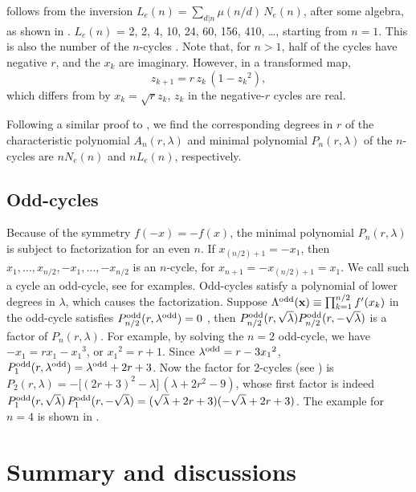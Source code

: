 \documentclass[preprint]{revtex4-1}
\begin{document}
 follows from the inversion
  $L_e(n) = \sum_{d|n} \mu(n/d) \, N_e(n)$,
after some algebra, as shown in .
%
$L_e(n)$ = 2, 2, 4, 10, 24, 60, 156, 410, \ldots, starting from $n = 1$.
%
This is also the number of the $n$-cycles \cite{hao}.
Note that, for $n>1$, half of the cycles have negative $r$,
and the $x_k$ are imaginary.
However, in a transformed map,
\[
z_{k+1} = r \, z_k \, (1 - {z_k}^2),
\]
which differs from  by $x_k = \sqrt{r} z_k$,
$z_k$ in the negative-$r$ cycles are real.



Following a similar proof to ,
we find the corresponding degrees in $r$
of the characteristic polynomial $A_n(r, \lambda)$
  and minimal polynomial $P_n(r, \lambda)$ of the $n$-cycles
are $n N_e(n)$ and $n L_e(n)$, respectively.


\subsection{\label{sec:oddcycle}Odd-cycles}

Because of the symmetry $f(-x) = -f(x)$,
the minimal polynomial $P_n(r, \lambda)$
is subject to factorization for an even $n$.
%
If $x_{(n/2)+1} = -x_1$,
  then $x_1, \ldots, x_{n/2}, -x_1, \ldots, -x_{n/2}$
  is an $n$-cycle,
  for $x_{n+1} = - x_{(n/2)+1} = x_1$.
We call such a cycle an odd-cycle,
see  for examples.
%
Odd-cycles satisfy a polynomial
  of lower degrees in $\lambda$,
  which causes the factorization.
%
Suppose $\Lambda^{\mathrm{odd}}(\mathbf{x}) \equiv \prod_{k = 1}^{n/2} f'(x_k)$ in the odd-cycle
 satisfies $P_{n/2}^{\mathrm{odd}}(r, \lambda^{\mathrm{odd}}) = 0$
\big[where $\lambda^\odd$ is the value of $\Lambda^\odd(\vx)$,
and $\lambda^\odd = \pm\sqrt \lambda$\,\big],
then $P^{\mathrm{odd}}_{n/2}(r, \sqrt \lambda) P^{\mathrm{odd}}_{n/2}(r, -\sqrt \lambda)$
is a factor of $P_{n}(r, \lambda)$.
%
For example, by solving the $n = 2$ odd-cycle,
  we have $- x_1 = r x_1 - {x_1}^3$, or ${x_1}^2 = r + 1$.
Since $\lambda^{\mathrm{odd}} = r - 3 {x_1}^2$,
$P^{\mathrm{odd}}_1(r, \lambda^{\mathrm{odd}}) = \lambda^{\mathrm{odd}} + 2 r + 3$.
%
Now the factor for 2-cycles (see )
  is
  $P_2(r,\lambda) = -\big[(2r+3)^2 - \lambda\big]\,(\lambda + 2r^2-9)$,
  whose first factor is indeed
  $P^{\mathrm{odd}}_1(r, \sqrt \lambda) \, P^{\mathrm{odd}}_1(r, -\sqrt \lambda)
   = (\sqrt \lambda + 2 r + 3)(-\sqrt \lambda + 2 r + 3)$.
%
The example for $n=4$ is shown in .




\section{\label{sec:end}Summary and discussions}
\end{document}
